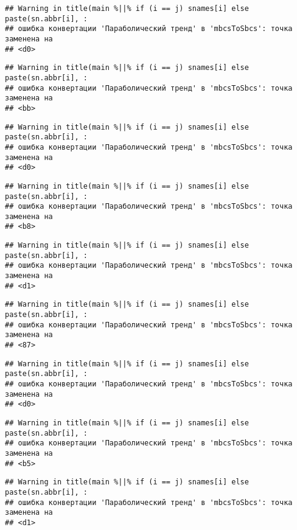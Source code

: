 \documentclass[
]{article}
\begin{document}
\begin{verbatim}
## Warning in title(main %||% if (i == j) snames[i] else paste(sn.abbr[i], :
## ошибка конвертации 'Параболический тренд' в 'mbcsToSbcs': точка заменена на
## <d0>
\end{verbatim}

\begin{verbatim}
## Warning in title(main %||% if (i == j) snames[i] else paste(sn.abbr[i], :
## ошибка конвертации 'Параболический тренд' в 'mbcsToSbcs': точка заменена на
## <bb>
\end{verbatim}

\begin{verbatim}
## Warning in title(main %||% if (i == j) snames[i] else paste(sn.abbr[i], :
## ошибка конвертации 'Параболический тренд' в 'mbcsToSbcs': точка заменена на
## <d0>
\end{verbatim}

\begin{verbatim}
## Warning in title(main %||% if (i == j) snames[i] else paste(sn.abbr[i], :
## ошибка конвертации 'Параболический тренд' в 'mbcsToSbcs': точка заменена на
## <b8>
\end{verbatim}

\begin{verbatim}
## Warning in title(main %||% if (i == j) snames[i] else paste(sn.abbr[i], :
## ошибка конвертации 'Параболический тренд' в 'mbcsToSbcs': точка заменена на
## <d1>
\end{verbatim}

\begin{verbatim}
## Warning in title(main %||% if (i == j) snames[i] else paste(sn.abbr[i], :
## ошибка конвертации 'Параболический тренд' в 'mbcsToSbcs': точка заменена на
## <87>
\end{verbatim}

\begin{verbatim}
## Warning in title(main %||% if (i == j) snames[i] else paste(sn.abbr[i], :
## ошибка конвертации 'Параболический тренд' в 'mbcsToSbcs': точка заменена на
## <d0>
\end{verbatim}

\begin{verbatim}
## Warning in title(main %||% if (i == j) snames[i] else paste(sn.abbr[i], :
## ошибка конвертации 'Параболический тренд' в 'mbcsToSbcs': точка заменена на
## <b5>
\end{verbatim}

\begin{verbatim}
## Warning in title(main %||% if (i == j) snames[i] else paste(sn.abbr[i], :
## ошибка конвертации 'Параболический тренд' в 'mbcsToSbcs': точка заменена на
## <d1>
\end{verbatim}
\end{document}
